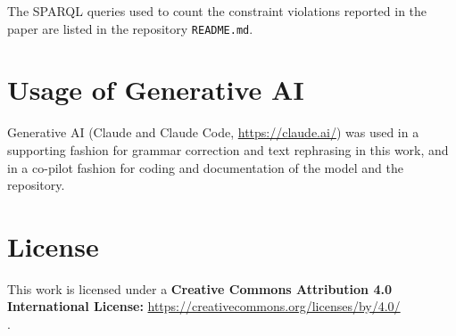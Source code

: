 \documentclass[runningheads]{llncs}
\newcommand{\suppurl}[2]{\noindent\textbf{#1:} \url{#2}\\}
\begin{document}
The SPARQL queries used to count the constraint violations reported in the paper are listed in the
repository \texttt{README.md}.

\section{Usage of Generative AI}
Generative AI (Claude and Claude Code, \url{https://claude.ai/}) was used in a supporting fashion for grammar correction and text rephrasing in this work, and in a co-pilot fashion for coding and documentation of the model and the repository.

\section{License}
This work is licensed under a \suppurl{Creative Commons Attribution 4.0 International License}{https://creativecommons.org/licenses/by/4.0/}.
\end{document}
